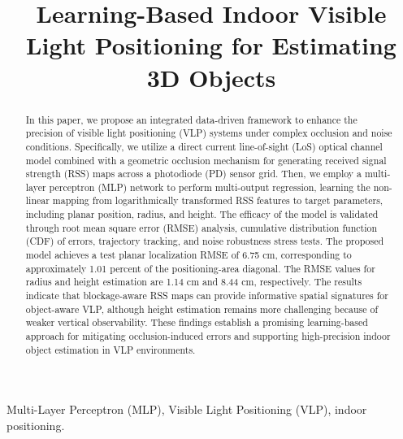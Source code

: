 \documentclass[conference]{IEEEtran}
\begin{document}

\title{Learning-Based Indoor Visible Light Positioning for Estimating 3D Objects}

\author{
}
\maketitle

\begin{abstract}
In this paper, we propose an integrated data-driven framework to enhance the precision of visible light positioning (VLP) systems under complex occlusion and noise conditions. Specifically, we utilize a direct current line-of-sight (LoS) optical channel model combined with a geometric occlusion mechanism for generating received signal strength (RSS) maps across a photodiode (PD) sensor grid. Then, we employ a multi-layer perceptron (MLP) network to perform multi-output regression, learning the non-linear mapping from logarithmically transformed RSS features to target parameters, including planar position, radius, and height. The efficacy of the model is validated through root mean square error (RMSE) analysis, cumulative distribution function (CDF) of errors, trajectory tracking, and noise robustness stress tests. The proposed model achieves a test planar localization RMSE of 6.75 cm, corresponding to approximately 1.01 percent of the positioning-area diagonal. The RMSE values for radius and height estimation are 1.14 cm and 8.44 cm, respectively. The results indicate that blockage-aware RSS maps can provide informative spatial signatures for object-aware VLP, although height estimation remains more challenging because of weaker vertical observability. These findings establish a promising learning-based approach for mitigating occlusion-induced errors and supporting high-precision indoor object estimation in VLP environments.
\end{abstract}

\begin{IEEEkeywords}
Multi-Layer Perceptron (MLP), Visible Light Positioning (VLP), indoor positioning.
\end{IEEEkeywords}
\end{document}
